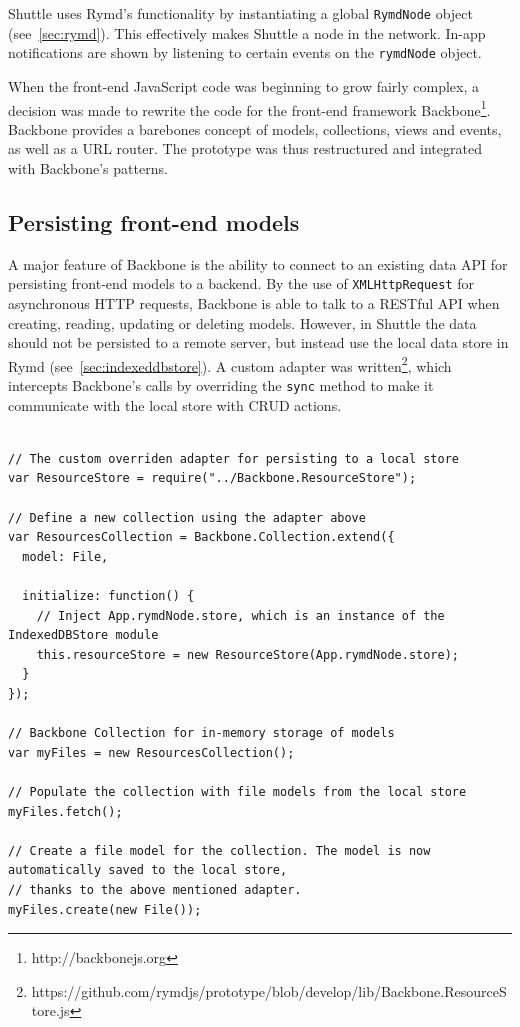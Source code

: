 Shuttle uses Rymd's functionality by instantiating a global \texttt{RymdNode} object (see~\ref{sec:rymd}). This effectively makes Shuttle a node in the network. In-app notifications are shown by listening to certain events on the \texttt{rymdNode} object.

When the front-end JavaScript code was beginning to grow fairly complex, a decision was made to rewrite the code for the front-end framework Backbone\footnote{http://backbonejs.org}. Backbone provides a barebones concept of models, collections, views and events, as well as a URL router. The prototype was thus restructured and integrated with Backbone's patterns.

\subsection{Persisting front-end models}

A major feature of Backbone is the ability to connect to an existing data API for persisting front-end models to a backend. By the use of \texttt{XMLHttpRequest} for asynchronous HTTP requests, Backbone is able to talk to a RESTful API when creating, reading, updating or deleting models. However, in Shuttle the data should not be persisted to a remote server, but instead use the local data store in Rymd (see~\ref{sec:indexeddbstore}). A custom adapter was written\footnote{https://github.com/rymdjs/prototype/blob/develop/lib/Backbone.ResourceStore.js}, which intercepts Backbone's calls by overriding the \texttt{sync} method to make it communicate with the local store with CRUD actions.

\begin{Code}
\begin{lstlisting}[caption={Sample scenario of persisting models}, label={lst:backbonesync}]

// The custom overriden adapter for persisting to a local store
var ResourceStore = require("../Backbone.ResourceStore");

// Define a new collection using the adapter above
var ResourcesCollection = Backbone.Collection.extend({
  model: File,

  initialize: function() {
    // Inject App.rymdNode.store, which is an instance of the IndexedDBStore module
    this.resourceStore = new ResourceStore(App.rymdNode.store);
  }
});

// Backbone Collection for in-memory storage of models
var myFiles = new ResourcesCollection();

// Populate the collection with file models from the local store
myFiles.fetch();

// Create a file model for the collection. The model is now automatically saved to the local store,
// thanks to the above mentioned adapter.
myFiles.create(new File());
\end{lstlisting}
\end{Code}

